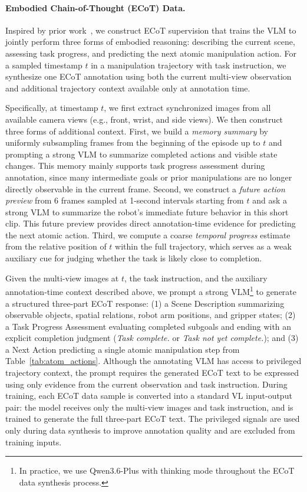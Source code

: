 \paragraph{Embodied Chain-of-Thought (ECoT) Data.}
Inspired by prior work~\citep{zawalski2024robotic, feng2026@procvlm, li2026@robointer}, we construct ECoT supervision that trains the VLM to jointly perform three forms of embodied reasoning: describing the current scene, assessing task progress, and predicting the next atomic manipulation action. For a sampled timestamp $t$ in a manipulation trajectory with task instruction, we synthesize one ECoT annotation using both the current multi-view observation and additional trajectory context available only at annotation time.

Specifically, at timestamp $t$, we first extract synchronized images from all available camera views (e.g., front, wrist, and side views). We then construct three forms of additional context. First, we build a \textit{memory summary} by uniformly subsampling frames from the beginning of the episode up to $t$ and prompting a strong VLM to summarize completed actions and visible state changes. This memory mainly supports task progress assessment during annotation, since many intermediate goals or prior manipulations are no longer directly observable in the current frame. Second, we construct a \textit{future action preview} from 6 frames sampled at 1-second intervals starting from $t$ and ask a strong VLM to summarize the robot's immediate future behavior in this short clip. This future preview provides direct annotation-time evidence for predicting the next atomic action. Third, we compute a coarse \textit{temporal progress} estimate from the relative position of $t$ within the full trajectory, which serves as a weak auxiliary cue for judging whether the task is likely close to completion.

Given the multi-view images at $t$, the task instruction, and the auxiliary annotation-time context described above, we prompt a strong VLM\footnote{In practice, we use Qwen3.6-Plus with thinking mode throughout the ECoT data synthesis process.} to generate a structured three-part ECoT response: (1) a Scene Description summarizing observable objects, spatial relations, robot arm positions, and gripper states; (2) a Task Progress Assessment evaluating completed subgoals and ending with an explicit completion judgment (\textit{Task complete.} or \textit{Task not yet complete.}); and (3) a Next Action predicting a single atomic manipulation step from Table~\ref{tab:atom_actions}. Although the annotating VLM has access to privileged trajectory context, the prompt requires the generated ECoT text to be expressed using only evidence from the current observation and task instruction. During training, each ECoT data sample is converted into a standard VL input-output pair: the model receives only the multi-view images and task instruction, and is trained to generate the full three-part ECoT text. The privileged signals are used only during data synthesis to improve annotation quality and are excluded from training inputs.

